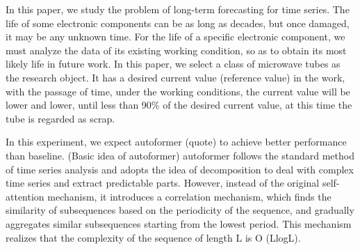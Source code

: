 In this paper, we study the problem of long-term forecasting for time series. The life of some electronic components can be as long as decades, but once damaged, it may be any unknown time. For the life of a specific electronic component, we must analyze the data of its existing working condition, so as to obtain its most likely life in future work. In this paper, we select a class of microwave tubes as the research object. It has a desired current value (reference value) in the work, with the passage of time, under the working conditions, the current value will be lower and lower, until less than 90\% of the desired current value, at this time the tube is regarded as scrap.

In this experiment, we expect autoformer (quote) to achieve better performance than baseline. (Basic idea of autoformer) autoformer follows the standard method of time series analysis and adopts the idea of decomposition to deal with complex time series and extract predictable parts. However, instead of the original self-attention mechanism, it introduces a correlation mechanism, which finds the similarity of subsequences based on the periodicity of the sequence, and gradually aggregates similar subsequences starting from the lowest period. This mechanism realizes that the complexity of the sequence of length L is O (LlogL).
%
%
%
%
%
